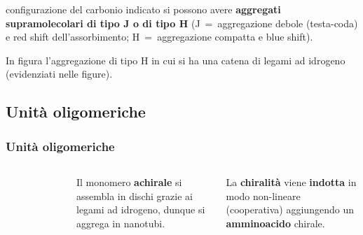 \begin{frame}
configurazione del carbonio indicato si possono avere \textbf{aggregati supramolecolari di tipo J o di tipo H} (J~=~aggregazione debole (testa-coda) e red shift dell'assorbimento; H~=~aggregazione compatta e blue shift). 

In figura l'aggregazione di tipo H in cui si ha una catena di legami ad idrogeno (evidenziati nelle figure). \cite{9}
  \end{frame} 

\subsection{Unità oligomeriche}\begin{frame}\frametitle{Unità oligomeriche}
           \begin{columns}
\begin{figure}{}\end{figure}   Il monomero \textbf{achirale} si assembla in dischi grazie ai legami ad idrogeno, dunque si aggrega in nanotubi. 

La \textbf{chiralità} viene \textbf{indotta} in modo non-lineare (cooperativa) aggiungendo un \textbf{amminoacido} chirale. \cite{8}
       \end{columns}      \end{frame}  

